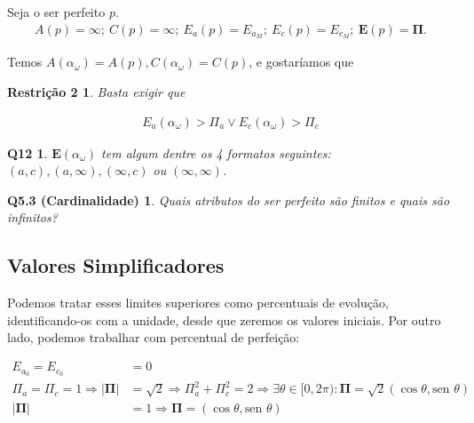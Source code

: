 \documentclass[12pt,a4paper]{article}
\begin{document}
			Seja o ser perfeito $p$.
			\begin{align*}
				A(p) = \infty; \
				C(p) = \infty; \
				E_a(p) = E_{a_M}; \
				E_c(p) = E_{c_M}; \
				\mathbf{E}(p) = \mathbf{\Pi}.
			\end{align*}

			Temos $A(\alpha_\omega) = A(p), C(\alpha_\omega) = C(p)$, e gostar\'iamos que

			\begin{center}
				\fbox{$|E(s)| \le |\mathbf{\Pi}| \Leftrightarrow s \neq \alpha_\omega$
				}
			\end{center}

			\newtheorem{R2}{Restri\c{c}\~ao 2}
			\begin{R2} Basta exigir que
			\end{R2}

			\begin{align}
				E_a(\alpha_\omega) > \Pi_a \vee E_c(\alpha_\omega) > \Pi_c
			\end{align}

			\newtheorem{Q12}{Q12}
			\begin{Q12} $ \mathbf{E}(\alpha_\omega)$ tem algum dentre os 4 formatos seguintes: $ (a, c), (a, \infty), (\infty, c) $ ou $ (\infty, \infty) $.
			\end{Q12}

			\newtheorem{Q5.3}{Q5.3 (Cardinalidade)}
			\begin{Q5.3} Quais atributos do ser perfeito s\~ao finitos e quais s\~ao infinitos?
			\end{Q5.3}

		\subsection{Valores Simplificadores}
			\begin{flushright}
			\end{flushright}

			Podemos tratar esses limites superiores como percentuais de evolu\c{c}\~ao, identificando-os com a unidade, desde que zeremos os valores iniciais. Por outro lado, podemos trabalhar com percentual de perfei\c{c}\~ao:

			\begin{align*}
				E_{a_0} = E_{c_0} &= 0 \\
				\Pi_a = \Pi_c = 1 \Rightarrow |\mathbf{\Pi}| &= \sqrt{2} \Rightarrow \Pi_a^2 + \Pi_c^2 = 2 \Rightarrow \exists \theta \in [0, 2\pi) : \mathbf{\Pi} = \sqrt{2} (\cos \theta, \mbox{sen } \theta) \\
				|\mathbf{\Pi}| &= 1 \Rightarrow \mathbf{\Pi} = (\cos \theta, \mbox{sen } \theta)
			\end{align*}
\end{document}
